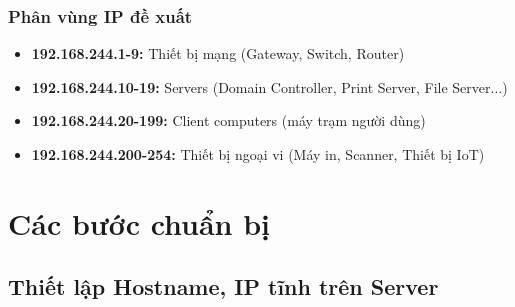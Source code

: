\subsection*{Phân vùng IP đề xuất}
\begin{itemize}[leftmargin=*,noitemsep,topsep=3pt]
    \item \textbf{192.168.244.1-9:} Thiết bị mạng (Gateway, Switch, Router)
    \item \textbf{192.168.244.10-19:} Servers (Domain Controller, Print Server, File Server...)
    \item \textbf{192.168.244.20-199:} Client computers (máy trạm người dùng)
    \item \textbf{192.168.244.200-254:} Thiết bị ngoại vi (Máy in, Scanner, Thiết bị IoT)
\end{itemize}
\vspace{\baselineskip}
\chapter{\textbf{Các bước chuẩn bị}}
\section{Thiết lập Hostname, IP tĩnh trên Server}

